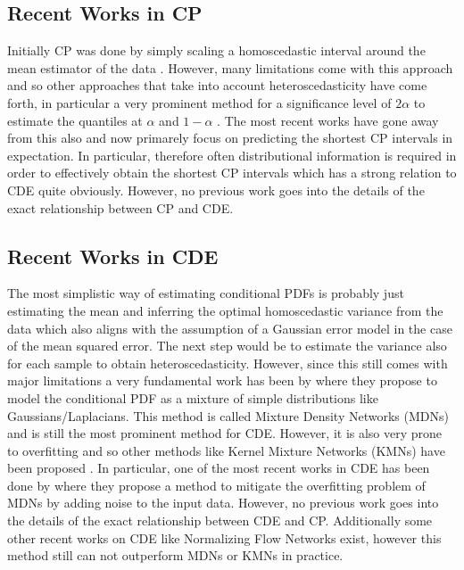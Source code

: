 \subsection{Recent Works in CP}

Initially CP was done by simply scaling a homoscedastic interval around the mean estimator of the data \cite{lei2018distribution}. However, many limitations come with this approach and so other approaches that take into account heteroscedasticity have come forth, in particular a very prominent method for a significance level of $2 \alpha$ to estimate the quantiles at $\alpha$ and $1 - \alpha$ \cite{romano2019conformalized}. The most recent works have gone away from this also and now primarely focus on predicting the shortest CP intervals \cite{sesia2021conformal,chernozhukov2021distributional,izbicki2022cd} in expectation. In particular, therefore often distributional information is required in order to effectively obtain the shortest CP intervals which has a strong relation to CDE quite obviously. However, no previous work goes into the details of the exact relationship between CP and CDE.

\subsection{Recent Works in CDE}

The most simplistic way of estimating conditional PDFs is probably just estimating the mean and inferring the optimal homoscedastic variance from the data which also aligns with the assumption of a Gaussian error model in the case of the mean squared error. The next step would be to estimate the variance also for each sample to obtain heteroscedasticity. However, since this still comes with major limitations a very fundamental work has been by \cite{bishop1994mixture} where they propose to model the conditional PDF as a mixture of simple distributions like Gaussians/Laplacians. This method is called Mixture Density Networks (MDNs) and is still the most prominent method for CDE. However, it is also very prone to overfitting and so other methods like Kernel Mixture Networks (KMNs) have been proposed \cite{ambrogioni2017kernel}. In particular, one of the most recent works in CDE has been done by \cite{rothfuss2019noise} where they propose a method to mitigate the overfitting problem of MDNs by adding noise to the input data. However, no previous work goes into the details of the exact relationship between CDE and CP. Additionally some other recent works on CDE like Normalizing Flow Networks \cite{trippe2018conditional} exist, however this method still can not outperform MDNs or KMNs in practice.

